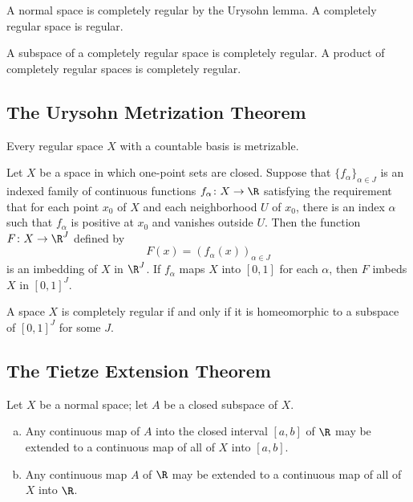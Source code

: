 \begin{remark}
A normal space is completely regular by the Urysohn lemma. A completely regular space is regular.
\end{remark}

\begin{theorem}
A subspace of a completely regular space is completely regular. A product of completely regular spaces is completely regular.
\end{theorem}

\subsection{The Urysohn Metrization Theorem}

\begin{theorem}
Every regular space $X$ with a countable basis is metrizable.
\end{theorem}

\begin{theorem}
Let $X$ be a space in which one-point sets are closed. Suppose that $\{ f_\alpha \}_{\alpha \in J}$ is an indexed family of continuous functions
$f_\alpha \colon X \rightarrow \R$ satisfying the requirement that for each point $x_0$ of $X$ and each neighborhood $U$ of $x_0$, there is an index $\alpha$
such that $f_\alpha$ is positive at $x_0$ and vanishes outside $U$. Then the function $F\colon X \rightarrow \R^J$ defined by
\[
    F(x) = (f_\alpha(x))_{\alpha \in J}
\]
is an imbedding of $X$ in $\R^J$. If $f_\alpha$ maps $X$ into $[0, 1]$ for each $\alpha$, then $F$ imbeds $X$ in $[0, 1]^J$.
\end{theorem}

\begin{theorem}
A space $X$ is completely regular if and only if it is homeomorphic to a subspace of $[0, 1]^J$ for some $J$.
\end{theorem}

\subsection{The Tietze Extension Theorem}

\begin{theorem}
Let $X$ be a normal space; let $A$ be a closed subspace of $X$.
\begin{enumerate}[a)]
    \item Any continuous map of $A$ into the closed interval $[a, b]$ of $\R$ may be extended to a continuous map of all of $X$ into $[a, b]$.
    \item Any continuous map $A$ of $\R$ may be extended to a continuous map of all of $X$ into $\R$.
\end{enumerate}
\end{theorem}



